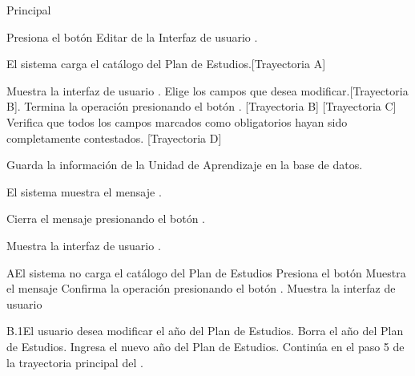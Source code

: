 \begin{UCtrayectoria}{Principal}

    \UCpaso[\UCactor] Presiona el botón Editar de la Interfaz de usuario .

    \UCpaso El sistema carga el catálogo del Plan de Estudios.[Trayectoria A]


    \UCpaso Muestra la interfaz de usuario .
    \UCpaso[\UCactor] Elige los campos que desea modificar.[Trayectoria B].
    \UCpaso[\UCactor] Termina la operación presionando el botón . [Trayectoria B] [Trayectoria C]
    \UCpaso Verifica que todos los campos marcados como obligatorios hayan sido completamente contestados. [Trayectoria D]

    \UCpaso Guarda la información de la Unidad de Aprendizaje en la base de datos.

    \UCpaso El sistema muestra el mensaje .

    \UCpaso[\UCactor] Cierra el mensaje presionando el botón .

    \UCpaso Muestra la interfaz de usuario .
\end{UCtrayectoria}


\begin{UCtrayectoriaA}{A}{El sistema no carga el catálogo del Plan de Estudios}
	\UCpaso[\UCactor] Presiona el botón 
	\UCpaso Muestra el mensaje 
	\UCpaso[\UCactor] Confirma la operación presionando el botón .
	 \UCpaso Muestra la interfaz de usuario 

\end{UCtrayectoriaA}


\begin{UCtrayectoriaA}{B.1}{El usuario desea modificar el año del Plan de Estudios.}
	\UCpaso[\UCactor] Borra el año del Plan de Estudios.
	\UCpaso[\UCactor] Ingresa el nuevo año del Plan de Estudios.
	\UCpaso Continúa en el paso 5 de la trayectoria principal del .
\end{UCtrayectoriaA}

